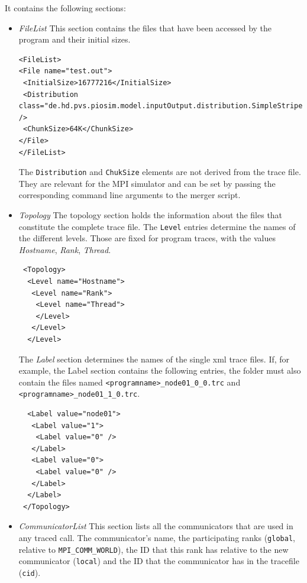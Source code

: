 \documentclass[a4paper,12pt,pdftex]{scrartcl}
\begin{document}
It contains the following sections: 
\begin{itemize}
\item \emph{FileList} This section contains the files that have been
  accessed by the program and their initial sizes. 
\begin{lstlisting}[caption=FileList section]
<FileList>
<File name="test.out">
 <InitialSize>16777216</InitialSize>
 <Distribution 
class="de.hd.pvs.piosim.model.inputOutput.distribution.SimpleStripe" />
 <ChunkSize>64K</ChunkSize>
</File>
</FileList>
\end{lstlisting}
The \verb/Distribution/ and \verb/ChukSize/ elements are not derived
from the trace file. They are relevant for the MPI simulator and can
be set by passing the corresponding command line arguments to the
merger script.
\item \emph{Topology} The topology section holds the information about
  the files that constitute the complete trace file. The \verb/Level/
  entries determine the names of the different levels. Those are fixed
  for program traces, with the values \emph{Hostname}, \emph{Rank},
  \emph{Thread}.

\begin{lstlisting}
 <Topology>
  <Level name="Hostname">
   <Level name="Rank">
    <Level name="Thread">
    </Level>
   </Level>
  </Level>
\end{lstlisting}

  The \emph{Label} section determines the names of the single xml
  trace files. If, for example, the Label section contains the
  following entries, the folder must also contain the files named
  \verb/<programname>_node01_0_0.trc/ and
  \verb/<programname>_node01_1_0.trc/.
\begin{lstlisting}
  <Label value="node01">
   <Label value="1">
    <Label value="0" />
   </Label>
   <Label value="0">
    <Label value="0" />
   </Label>
  </Label>
 </Topology>
\end{lstlisting}

\item \emph{CommunicatorList} This section lists all the communicators
  that are used in any traced call. The communicator's name, the
  participating ranks (\verb/global/, relative to
  \verb/MPI_COMM_WORLD/), the ID that this rank has relative to the
  new communicator (\verb/local/) and the ID that the communicator has
  in the tracefile (\verb/cid/).


\end{itemize}
\end{document}
